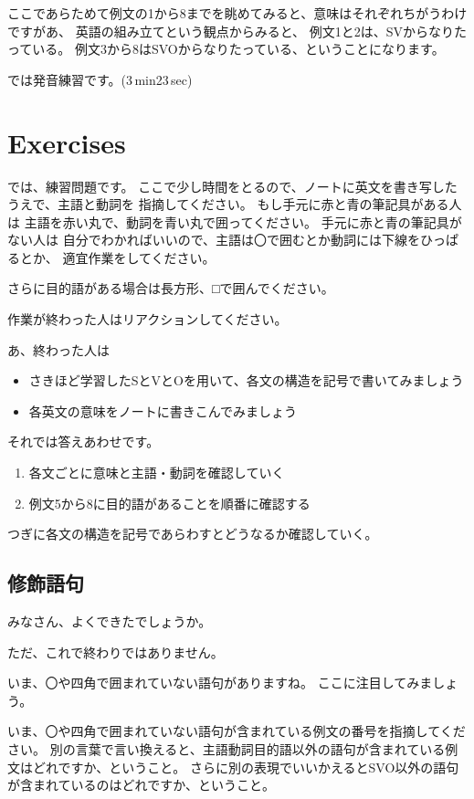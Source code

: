 \documentclass[book,jafontscale=0.9247]{jlreq}
\begin{document}
ここであらためて例文の1から8までを眺めてみると、意味はそれぞれちがうわけですがあ、
英語の組み立てという観点からみると、
例文1と2は、SVからなりたっている。
例文3から8はSVOからなりたっている、ということになります。

では発音練習です。\faVolumeUp(3\,min23\,sec)

\section{Exercises}

では、練習問題です。
ここで少し時間をとるので、ノートに英文を書き写したうえで、主語と動詞を
指摘してください。
もし手元に赤と青の筆記具がある人は
主語を赤い丸で、動詞を青い丸で囲ってください。
手元に赤と青の筆記具がない人は
自分でわかればいいので、主語は〇で囲むとか動詞には下線をひっぱるとか、
適宜作業をしてください。

さらに目的語がある場合は長方形、□で囲んでください。

作業が終わった人はリアクションしてください。


あ、終わった人は
\begin{itemize}
 \item さきほど学習したSとVとOを用いて、各文の構造を記号で書いてみましょう
 \item 各英文の意味をノートに書きこんでみましょう
\end{itemize}


それでは答えあわせです。

\begin{enumerate}
 \item 各文ごとに意味と主語・動詞を確認していく
 \item 例文5から8に目的語があることを順番に確認する
\end{enumerate}

つぎに各文の構造を記号であらわすとどうなるか確認していく。

\subsection{修飾語句}
みなさん、よくできたでしょうか。

ただ、これで終わりではありません。

いま、〇や四角で囲まれていない語句がありますね。
ここに注目してみましょう。

いま、〇や四角で囲まれていない語句が含まれている例文の番号を指摘してください。
別の言葉で言い換えると、主語動詞目的語以外の語句が含まれている例文はどれですか、ということ。
さらに別の表現でいいかえるとSVO以外の語句が含まれているのはどれですか、ということ。
\end{document}
